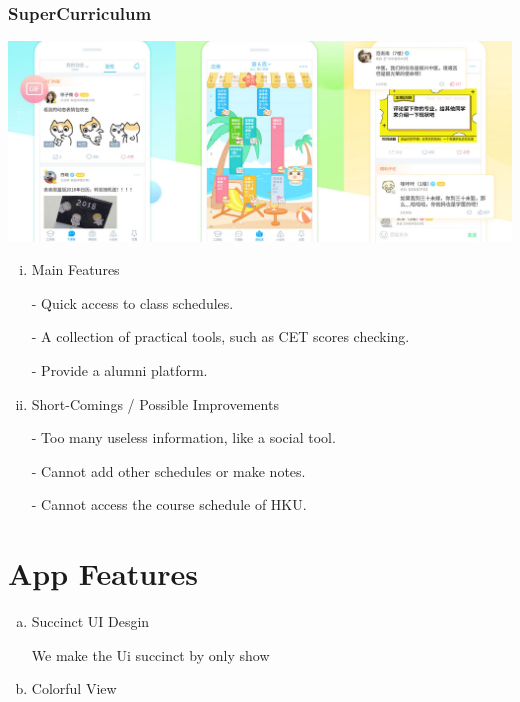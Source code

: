 \documentclass{article}
\begin{document}
    \subsubsection{SuperCurriculum}
    \begin{center}
        \includegraphics[width=6.5in]{SuperCurriculum}
    \end{center}
    \begin{enumerate}[i)]

    \item Main Features

    - Quick access to class schedules.

    - A collection of practical tools, such as CET scores checking.
    
    - Provide a alumni platform.

    \item Short-Comings / Possible Improvements
    
    - Too many useless information, like a social tool.

    - Cannot add other schedules or make notes.

    - Cannot access the course schedule of HKU.

    \end{enumerate}




    \section{App Features}

    \begin{enumerate}[a)]
    \item Succinct UI Desgin
    
    We make the Ui succinct by only show 
    
    \item Colorful View
    
    
    
    \end{enumerate}
    
\end{document}
